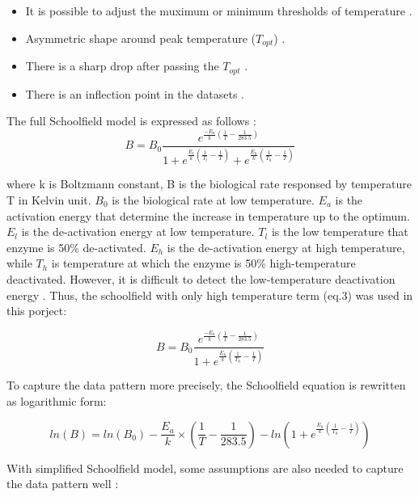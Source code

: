 \begin{itemize}
    \item It is possible to adjust the muximum or minimum thresholds of temperature \cite{briere_pracros_1999}.
    \item Asymmetric shape around peak temperature ($T_{opt}$) \cite{briere_pracros_1999}.
    \item There is a sharp drop after passing the $T_{opt}$ \cite{briere_pracros_1999}.
    \item There is an inflection point in the datasets \cite{briere_pracros_1999}.
\end{itemize}

The full Schoolfield model is expressed as follows \cite{SCHOOLFIELD1981719}:
\begin{equation}
    B = B_0 \frac { e^{\frac{-E_a}{k}(\frac{1}{T} - \frac{1}{283.5})} }
                { 1 + e^{\frac{E_l}{k}(\frac{1}{T_l} - \frac{1}{T})} +
                e^{\frac{E_h}{k} (\frac{1}{T_h} - \frac{1}{T}) }}
\end{equation}

where k is Boltzmann constant, B is the biological rate responsed by temperature T in Kelvin unit. $B_0$ is the biological rate at low temperature. $E_a$ is the activation energy that determine the increase in temperature up to the optimum. $E_l$
is the de-activation energy at low temperature. $T_l$ is the low temperature that enzyme is 50\% de-activated. $E_h$ is the de-activation energy at high temperature, while $T_h$ is temperature at which the enzyme is 50\% high-temperature deactivated.
However, it is difficult to detect the low-temperature deactivation energy \cite{kontopoulos_2018}. Thus, the schoolfield with only high temperature term (eq.3) was used in this porject:

\begin{equation}
    B = B_0 \frac { e^{\frac{-E_a}{k}(\frac{1}{T} - \frac{1}{283.5})} }
                { 1 + e^{\frac{E_h}{k} (\frac{1}{T_h} - \frac{1}{T}) }}
\end{equation}

To capture the data pattern more precisely, the Schoolfield equation is rewritten as logarithmic form:

\begin{equation}
    ln(B) = ln(B_0) - \frac{E_a}{k} \times (\frac{1}{T} - \frac{1}{283.5}) - ln(1 + e^{\frac{E_h}{k} (\frac{1}{T_h} - \frac{1}{T}) })
\end{equation}

With simplified Schoolfield model, some assumptions are also needed to capture the data pattern well \cite{delong_2017}:

